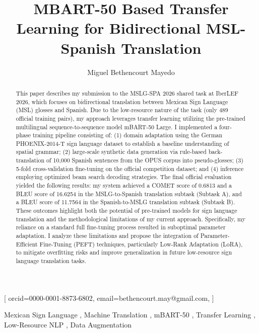 \documentclass[11pt,a4paper,english]{ceurart}
\begin{document}

\title{MBART-50 Based Transfer Learning for Bidirectional MSL-Spanish Translation}

\author[1]{Miguel Bethencourt Mayedo}[%
orcid=0000-0001-8873-6802,
email=bethencourt.may@gmail.com,
]
\cormark[1]
\address[1]{Universidad de Camag\"uey, Circunvalaci\'on Norte, Camino Viejo Km 5 y 1/2, 70100, Camag\"uey, Cuba}


\begin{abstract}
This paper describes my submission to the MSLG-SPA 2026 shared task at IberLEF 2026, which focuses on bidirectional translation between Mexican Sign Language (MSL) glosses and Spanish. Due to the low-resource nature of the task (only 489 official training pairs), my approach leverages transfer learning utilizing the pre-trained multilingual sequence-to-sequence model mBART-50 Large. I implemented a four-phase training pipeline consisting of: (1) domain adaptation using the German PHOENIX-2014-T sign language dataset to establish a baseline understanding of spatial grammar; (2) large-scale synthetic data generation via rule-based back-translation of 10,000 Spanish sentences from the OPUS corpus into pseudo-glosses; (3) 5-fold cross-validation fine-tuning on the official competition dataset; and (4) inference employing optimized beam search decoding strategies. The final official evaluation yielded the following results: my system achieved a COMET score of 0.6813 and a BLEU score of 16.6254 in the MSLG-to-Spanish translation subtask (Subtask A), and a BLEU score of 11.7564 in the Spanish-to-MSLG translation subtask (Subtask B). These outcomes highlight both the potential of pre-trained models for sign language translation and the methodological limitations of my current approach. Specifically, my reliance on a standard full fine-tuning process resulted in suboptimal parameter adaptation. I analyze these limitations and propose the integration of Parameter-Efficient Fine-Tuning (PEFT) techniques, particularly Low-Rank Adaptation (LoRA), to mitigate overfitting risks and improve generalization in future low-resource sign language translation tasks.
\end{abstract}

\begin{keywords}
  Mexican Sign Language \sep
  Machine Translation \sep
  mBART-50 \sep
  Transfer Learning \sep
  Low-Resource NLP \sep
  Data Augmentation
\end{keywords}
\end{document}
